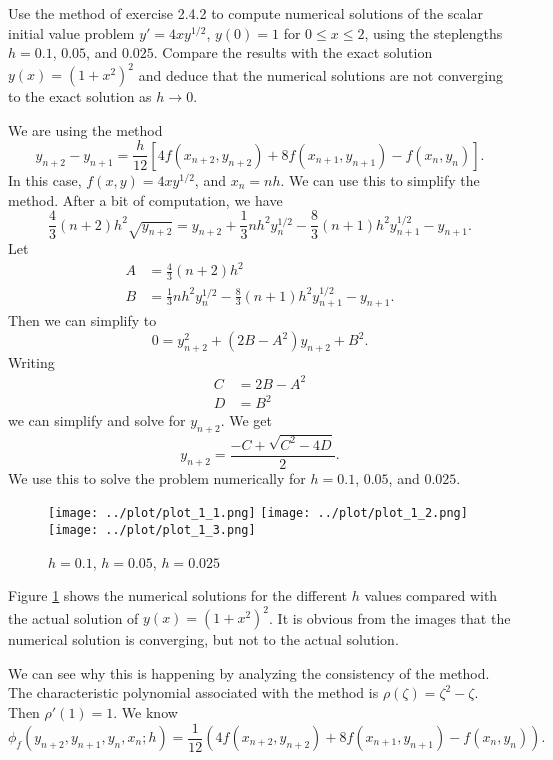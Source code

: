 \begin{problem}[L 2.4.2]
  Use the method of exercise 2.4.2 to compute numerical solutions of the scalar initial value problem $y' = 4xy^{1/2}$, $y(0) = 1$ for $0 \leq x \leq 2$, using the steplengths $h = 0.1$, $0.05$, and $0.025$. Compare the results with the exact solution $y(x) = (1 + x^2)^2$ and deduce that the numerical solutions are not converging to the exact solution as $h \to 0$.
\end{problem}

\begin{solution}
  We are using the method
  \[
    y_{n + 2} - y_{n + 1} = \frac{h}{12}\left[4 f(x_{n + 2}, y_{n + 2}) + 8 f(x_{n + 1}, y_{n + 1}) - f(x_n, y_n)\right].
  \]
  In this case, $f(x, y) = 4xy^{1/2}$, and $x_n = nh$. We can use this to simplify the method. After a bit of computation, we have
  \[
    \frac{4}{3} (n + 2) h^2 \sqrt{y_{n + 2}} = y_{n + 2} + \frac{1}{3} n h^2 y_n^{1/2} - \frac{8}{3} (n + 1) h^2 y_{n + 1}^{1/2} - y_{n + 1}.
  \]
  Let
  \begin{align*}
    A &= \frac{4}{3} (n + 2) h^2 \\
    B &= \frac{1}{3} n h^2 y_n^{1/2} - \frac{8}{3} (n + 1) h^2 y_{n + 1}^{1/2} - y_{n + 1}.
  \end{align*}
  Then we can simplify to
  \[
    0 = y_{n+2}^2 + (2B - A^2)y_{n+2} + B^2.
  \]
  Writing 
  \begin{align*}
    C &= 2B - A^2 \\
    D &= B^2
  \end{align*}
  we can simplify and solve for $y_{n+2}$. We get
  \[
    y_{n + 2} = \frac{-C + \sqrt{C^2 - 4D}}{2}.
  \]
  We use this to solve the problem numerically for $h = 0.1$, $0.05$, and $0.025$.
  
  \begin{figure}[!ht]
    \centering
    \texttt{[image: ../plot/plot\_1\_1.png]}
    \texttt{[image: ../plot/plot\_1\_2.png]}
    \texttt{[image: ../plot/plot\_1\_3.png]}
    \caption{$h = 0.1$, $h = 0.05$, $h = 0.025$}
    \label{fig:prob1}
  \end{figure}
  
  Figure \ref{fig:prob1} shows the numerical solutions for the different $h$ values compared with the actual solution of $y(x) = (1+x^2)^2$. It is obvious from the images that the numerical solution is converging, but not to the  actual solution.
  
  We can see why this is happening by analyzing the consistency of the method. The characteristic polynomial associated with the method is $\rho(\zeta) = \zeta^2 - \zeta$. Then $\rho'(1) = 1$. We know
  \[
    \phi_f(y_{n+2}, y_{n+1}, y_n, x_n; h) = \frac{1}{12}(4f(x_{n+2},y_{n+2}) + 8f(x_{n+1}, y_{n+1}) - f(x_n, y_n)).
  \]
  

\end{solution}
